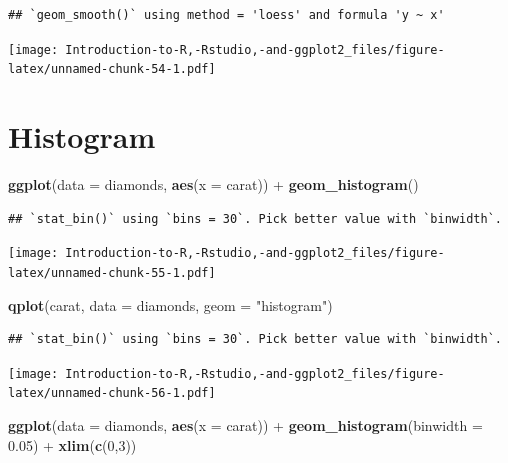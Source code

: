 \documentclass[]{book}
\newenvironment{Shaded}{\begin{snugshade}}{\end{snugshade}}
\newcommand{\KeywordTok}[1]{\textcolor[rgb]{0.13,0.29,0.53}{\textbf{{#1}}}}
\newcommand{\DataTypeTok}[1]{\textcolor[rgb]{0.13,0.29,0.53}{{#1}}}
\newcommand{\DecValTok}[1]{\textcolor[rgb]{0.00,0.00,0.81}{{#1}}}
\newcommand{\FloatTok}[1]{\textcolor[rgb]{0.00,0.00,0.81}{{#1}}}
\newcommand{\StringTok}[1]{\textcolor[rgb]{0.31,0.60,0.02}{{#1}}}
\newcommand{\NormalTok}[1]{{#1}}
\begin{document}
\begin{verbatim}
## `geom_smooth()` using method = 'loess' and formula 'y ~ x'
\end{verbatim}

\texttt{[image: Introduction-to-R,-Rstudio,-and-ggplot2\_files/figure-latex/unnamed-chunk-54-1.pdf]}

\section{Histogram}\label{histogram}

\begin{Shaded}
\begin{Highlighting}[]
\KeywordTok{ggplot}\NormalTok{(}\DataTypeTok{data =} \NormalTok{diamonds, }\KeywordTok{aes}\NormalTok{(}\DataTypeTok{x =} \NormalTok{carat)) +}\StringTok{ }\KeywordTok{geom_histogram}\NormalTok{()}
\end{Highlighting}
\end{Shaded}

\begin{verbatim}
## `stat_bin()` using `bins = 30`. Pick better value with `binwidth`.
\end{verbatim}

\texttt{[image: Introduction-to-R,-Rstudio,-and-ggplot2\_files/figure-latex/unnamed-chunk-55-1.pdf]}

\begin{Shaded}
\begin{Highlighting}[]
\KeywordTok{qplot}\NormalTok{(carat, }\DataTypeTok{data =} \NormalTok{diamonds, }\DataTypeTok{geom =} \StringTok{"histogram"}\NormalTok{)}
\end{Highlighting}
\end{Shaded}

\begin{verbatim}
## `stat_bin()` using `bins = 30`. Pick better value with `binwidth`.
\end{verbatim}

\texttt{[image: Introduction-to-R,-Rstudio,-and-ggplot2\_files/figure-latex/unnamed-chunk-56-1.pdf]}

\begin{Shaded}
\begin{Highlighting}[]
\KeywordTok{ggplot}\NormalTok{(}\DataTypeTok{data =} \NormalTok{diamonds, }\KeywordTok{aes}\NormalTok{(}\DataTypeTok{x =} \NormalTok{carat)) +}\StringTok{ }\KeywordTok{geom_histogram}\NormalTok{(}\DataTypeTok{binwidth =} \FloatTok{0.05}\NormalTok{) +}\StringTok{ }\KeywordTok{xlim}\NormalTok{(}\KeywordTok{c}\NormalTok{(}\DecValTok{0}\NormalTok{,}\DecValTok{3}\NormalTok{))}
\end{Highlighting}
\end{Shaded}
\end{document}
